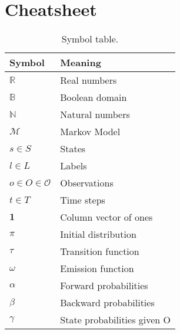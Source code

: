 \section{Cheatsheet}\label{sec:cheatsheet}

\begin{table}[htb!]
    \centering
    \caption{Symbol table.}
    \begin{tabular}{ll}
        \toprule
        \textbf{Symbol}                 & \textbf{Meaning}                                \\
        \midrule
        $\mathbb{R}$                    & Real numbers                                    \\
        $\mathbb{B}$                    & Boolean domain                                  \\
        $\mathbb{N}$                    & Natural numbers                                 \\
        $\mathcal{M}$                   & Markov Model                                    \\
        $s \in S$                       & States                                          \\
        $l \in L$                       & Labels                                          \\
        $o \in O \in \mathcal{O}$       & Observations                                    \\
        $t \in T$                       & Time steps                                      \\
        $\mathbf{1}$                    & Column vector of ones                           \\
        $\pi$                           & Initial distribution                            \\
        $\tau$                          & Transition function                             \\
        $\omega$                        & Emission function                               \\
        $\alpha$                        & Forward probabilities                           \\
        $\beta$                         & Backward probabilities                          \\
        $\gamma$                        & State probabilities given O                     \\

\end{tabular}
\end{table}
